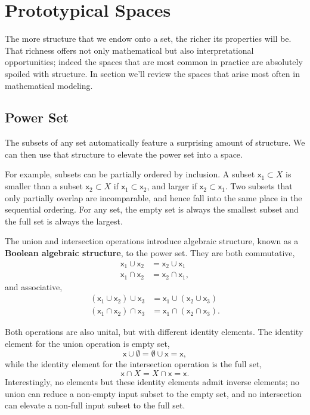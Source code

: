 \documentclass[
  letterpaper,
  DIV=11,
  numbers=noendperiod]{scrartcl}
\begin{document}
\section{Prototypical Spaces}\label{sec:proto-spaces}

The more structure that we endow onto a set, the richer its properties
will be. That richness offers not only mathematical but also
interpretational opportunities; indeed the spaces that are most common
in practice are absolutely spoiled with structure. In section we'll
review the spaces that arise most often in mathematical modeling.

\subsection{Power Set}\label{power-set}

The subsets of any set automatically feature a surprising amount of
structure. We can then use that structure to elevate the power set into
a space.

For example, subsets can be partially ordered by inclusion. A subset
\(\mathsf{x}_{1} \subset X\) is smaller than a subset
\(\mathsf{x}_{2} \subset X\) if
\(\mathsf{x}_{1} \subset \mathsf{x}_{2}\), and larger if
\(\mathsf{x}_{2} \subset \mathsf{x}_{1}\). Two subsets that only
partially overlap are incomparable, and hence fall into the same place
in the sequential ordering. For any set, the empty set is always the
smallest subset and the full set is always the largest.

The union and intersection operations introduce algebraic structure,
known as a \textbf{Boolean algebraic structure}, to the power set. They
are both commutative, \begin{align*}
\mathsf{x}_{1} \cup \mathsf{x}_{2}
&=
\mathsf{x}_{2} \cup \mathsf{x}_{1}
\\
\mathsf{x}_{1} \cap \mathsf{x}_{2}
&=
\mathsf{x}_{2} \cap \mathsf{x}_{1},
\end{align*} and associative, \begin{align*}
(\mathsf{x}_{1} \cup \mathsf{x}_{2}) \cup \mathsf{x}_{3}
&=
\mathsf{x}_{1} \cup (\mathsf{x}_{2} \cup \mathsf{x}_{3})
\\
(\mathsf{x}_{1} \cap \mathsf{x}_{2}) \cap \mathsf{x}_{3}
&=
\mathsf{x}_{1} \cap (\mathsf{x}_{2} \cap \mathsf{x}_{3}).
\end{align*}

Both operations are also unital, but with different identity elements.
The identity element for the union operation is empty set, \[
\mathsf{x} \cup \emptyset
=
\emptyset \cup \mathsf{x}
=
\mathsf{x},
\] while the identity element for the intersection operation is the full
set, \[
\mathsf{x} \cap X = X \cap \mathsf{x} = \mathsf{x}.
\] Interestingly, no elements but these identity elements admit inverse
elements; no union can reduce a non-empty input subset to the empty set,
and no intersection can elevate a non-full input subset to the full set.
\end{document}
